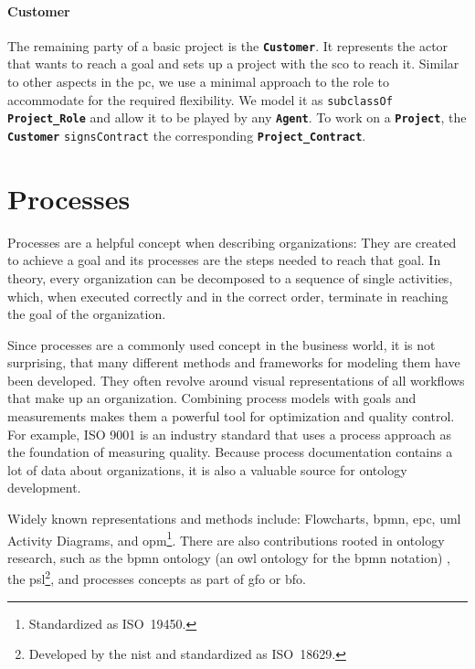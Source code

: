 \documentclass[a4paper, DIV=13, BCOR=0cm]{scrbook}
\newcommand{\class}[1]{\texttt{\textbf{#1}}}
\newcommand{\relation}[1]{\texttt{#1}}
\begin{document}
\paragraph{Customer}
The remaining party of a basic project is the \class{Customer}. It represents the actor that wants to reach a goal and sets up a project with the \gls{sco} to reach it. Similar to other aspects in the \gls{pc}, we use a minimal approach to the role to accommodate for the required flexibility. We model it as \relation{subclassOf} \class{Project\_Role} and allow it to be played by any \class{Agent}. To work on a \class{Project}, the \class{Customer} \relation{signsContract} the corresponding \class{Project\_Contract}.

\section{Processes }
\label{processes}
Processes are a helpful concept when describing organizations: They are created to achieve a goal and its processes are the steps needed to reach that goal. \cite[p.\,5, Definition 1.1]{Weske:2019aa} In theory, every organization can be decomposed to a sequence of single activities, which, when executed correctly and in the correct order, terminate in reaching the goal of the organization.

Since processes are a commonly used concept in the business world, it is not surprising, that many different methods and frameworks for modeling them have been developed. They often revolve around visual representations of all workflows that make up an organization. Combining process models with goals and measurements makes them a powerful tool for optimization and quality control. For example, ISO 9001 is an industry standard that uses a process approach as the foundation of measuring quality. \cite{iso-process-approach} Because process documentation contains a lot of data about organizations, it is also a valuable source for ontology development.

Widely known representations and methods include: Flowcharts, \gls{bpmn}, \gls{epc}, \gls{uml} Activity Diagrams, and \gls{opm}\footnote{Standardized as ISO~19450.}. There are also contributions rooted in ontology research, such as the \gls{bpmn} ontology (an \gls{owl} ontology for the \gls{bpmn} notation) \cite{2014foisbpmn}, the \gls{psl}\footnote{Developed by the \gls{nist} and standardized as ISO~18629.}, and processes concepts as part of \gls{gfo} or \gls{bfo}.
\end{document}
